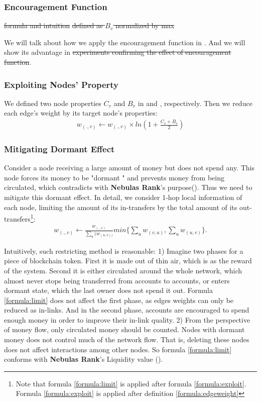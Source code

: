 \subsubsection{Encouragement Function}\label{subsec:encouragement}
\st{formula and intuition} \st{defined as $B_v$ normalized by max}

We will talk about how we apply the encouragement function in . And we will show its advantage in  \st{experiments confirming the effect of encouragement function}.

\subsubsection{Exploiting Nodes' Property} \label{subsec:reduction}
We defined two node properties $C_v$ and $B_v$ in  and , respectively. Then we reduce each edge's weight by its target node's properties:
\begin{align}\label{formula:exploit}
	w_{(.,v)} \leftarrow w_{(.,v)} \times ln(1 + \frac{C_v + B_v}{2})
\end{align}

\subsubsection{Mitigating Dormant Effect} \label{subsec:limit}
Consider a node receiving a large amount of money but does not spend any. This node forces its money to be "dormant " and prevents money from being circulated, which contradicts with \textbf{Nebulas Rank}'s purpose(). Thus we need to mitigate this dormant effect. In detail, we consider 1-hop local information of each node, limiting the amount of its in-transfers by the total amount of its out-transfers\footnote{Note that formula \ref{formula:limit} is applied after formula \ref{formula:exploit}. Formula  \ref{formula:exploit} is applied after definition \ref{formula:edgeweight}}:
\begin{align}
\label{formula:limit}
w_{(.,v)} \leftarrow  \frac{w_{(.,v)}}{\sum_u(w_{(u,v))}} min\{ \sum_u{w_{(v,u)}}, \sum_u{w_{(u,v)}} \}.
\end{align}

Intuitively, such restricting method is reasonable: 1) Imagine two phases for a piece of blockchain token. First it is made out of thin air, which is as the reward of the system. Second it is either circulated around the whole network, which almost never stops being transferred from accounts to accounts, or enters dormant state, which the last owner does not spend it out. Formula \ref{formula:limit} does not affect the first phase, as edges weights can only be reduced as in-links. And in the second phase, accounts are encouraged to spend enough money in order to improve their in-link quality. 2) From the perspective of money flow, only circulated money should be counted. Nodes with dormant money does not control much of the network flow. That is, deleting these nodes does not affect interactions among other nodes. So formula \ref{formula:limit} conforms with \textbf{Nebulas Rank}'s Liquidity value ().

